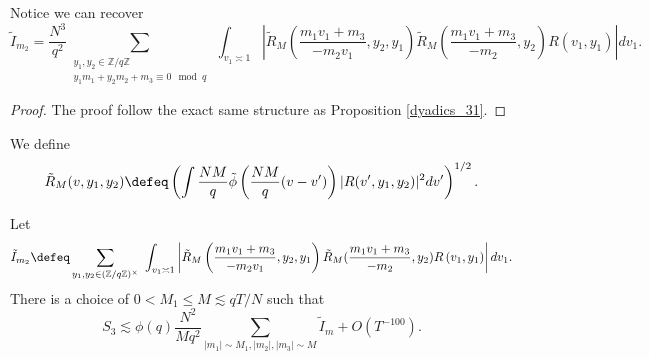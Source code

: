 \begin{remark}
    Notice we can recover
    \[
    \tilde{I}_{m_2}= \frac{N^3}{q^2} \sum_{\substack{y_1,y_2 \in\mathbb{Z}/q\mathbb{Z} \\ y_1m_1+y_2m_2+m_3\equiv 0 \mod q}}\ \int_{v_1\asymp 1} \left| \tilde{R}_M\left(\frac{m_1v_1+m_3}{-m_2v_1},y_2,y_1\right)
    \tilde{R}_M(\frac{m_1v_1+m_3}{-m_2},y_2)R\left(v_1,y_1\right)\right| dv_1.
    \]
\end{remark}
\begin{proof}
    The proof follow the exact same structure as Proposition \ref{dyadics_31}.
\end{proof}
\iffalse
We define \[
\tilde{R}_M(v,y_1,y_2) \defeq \left( \int \frac{NM}{q}\tilde{\phi}\left(\frac{NM}{q}(v-v')\right)|R(v',y_1,y_2)|^2 dv'\right)^{1/2}.
\]
\begin{proposition} \label{dyadics_3}
    Let \[
    \tilde{I}_{m_2}\defeq \sum_{y_1,y_2\in (\mathbb{Z}/q\mathbb{Z})^\times}\ \int_{v_1\asymp 1} \left| \tilde{R}_M\left(\frac{m_1v_1+m_3}{-m_2v_1},y_2,y_1\right)
    \tilde{R}_M(\frac{m_1v_1+m_3}{-m_2},y_2)R\left(v_1,y_1\right)\right| dv_1.
    \]
    There is a choice of $0<M_1\leq M \lesssim qT/N$ such that \[
        S_3\lesssim \phi(q)\frac{N^2}{Mq^2}\sum_{|m_1|\sim M_1,|m_2|,|m_3|\sim M}\tilde{I}_m+O(T^{-100}).
    \]
\end{proposition}


